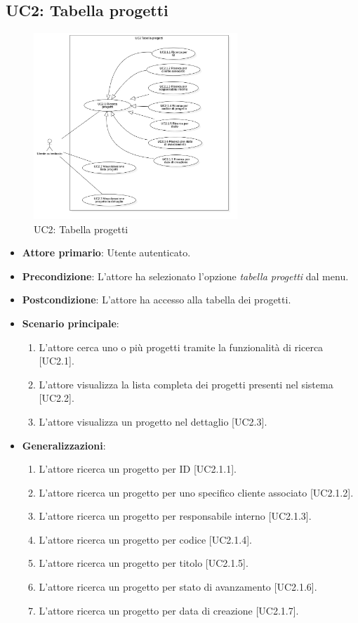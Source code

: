 \subsection{UC2: Tabella progetti}
\begin{figure}[!h]
\centering
\includegraphics[width=290px]{../images/UC/.jpeg/UC2.0-tabellaProgetti.jpg}
\caption{UC2: Tabella progetti}
\end{figure}

\pagebreak

\begin{itemize}
\item \textbf{Attore primario}: Utente autenticato.
\item \textbf{Precondizione}: L'attore ha selezionato l'opzione \textit{tabella progetti} dal menu.
\item \textbf{Postcondizione}: L'attore ha accesso alla tabella dei progetti.
\item \textbf{Scenario principale}: 
\begin{enumerate}
\item L'attore cerca uno o più progetti tramite la funzionalità di ricerca [UC2.1].
\item L'attore visualizza la lista completa dei progetti presenti nel sistema [UC2.2].
\item L'attore visualizza un progetto nel dettaglio [UC2.3].
\end{enumerate}
\item \textbf{Generalizzazioni}:
\begin{enumerate}
\item L'attore ricerca un progetto per ID [UC2.1.1].
\item L'attore ricerca un progetto per uno specifico cliente associato [UC2.1.2].
\item L'attore ricerca un progetto per responsabile interno [UC2.1.3].
\item L'attore ricerca un progetto per codice [UC2.1.4].
\item L'attore ricerca un progetto per titolo [UC2.1.5].
\item L'attore ricerca un progetto per stato di avanzamento [UC2.1.6].
\item L'attore ricerca un progetto per data di creazione [UC2.1.7].
\end{enumerate}
\end{itemize}

